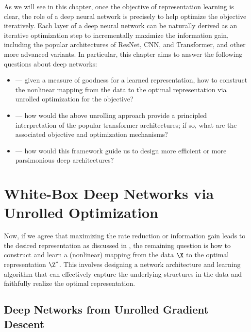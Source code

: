\documentclass[../../book-main.tex]{subfiles}
\begin{document}
As we will see in this chapter, once the objective of representation
learning is clear, the role of a deep neural network is precisely to
help optimize the objective iteratively. Each layer of a deep neural
network can be naturally derived as an iterative optimization step to
incrementally maximize the information gain, including the popular
architectures of ResNet, CNN, and Transformer, and other more
advanced variants. In particular, this chapter aims to answer the
following questions about deep networks:
\begin{itemize}
    \item {} --- given a
        measure of goodness for a learned representation, how to
        construct the nonlinear mapping from the data to the optimal
        representation via unrolled optimization for the objective?
    \item {} --- how would the
        above unrolling approach provide a principled interpretation
        of the popular transformer architectures; if so, what are the
        associated objective and optimization mechanisms?
    \item {} ---
        how would this framework guide us to design more efficient or
        more parsimonious deep architectures?
\end{itemize}

\section{White-Box Deep Networks via Unrolled
Optimization}\label{sec:chap4-white-box-model-via-unrolling}

Now, if we agree that maximizing the rate reduction or information
gain leads to the desired representation as discussed in
, the remaining
question is how to construct and learn a (nonlinear) mapping from the
data $\X$ to the optimal representation $\Z^*$. This involves
designing a network architecture and learning algorithm that can
effectively capture the underlying structures in the data and
faithfully realize the optimal representation.

\subsection{Deep Networks from Unrolled Gradient Descent}
\end{document}

